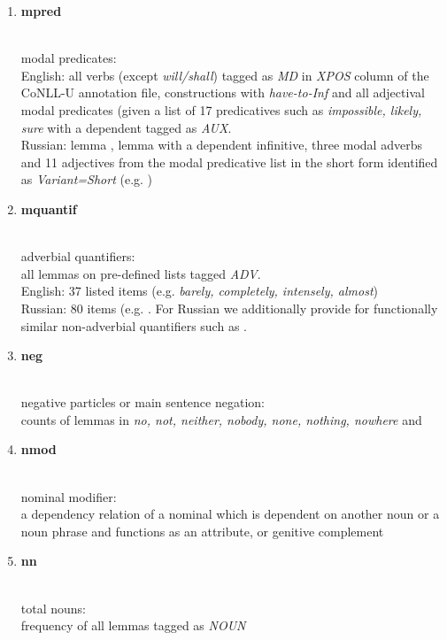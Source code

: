 \begin{enumerate}
	\item \hypertarget{ft:mpred}{\textbf{mpred}} \\
		modal predicates: \\
		English: all verbs (except \textit{will/shall}) tagged as \textit{MD} in \textit{XPOS} column of the CoNLL-U annotation file,
		constructions with \textit{have-to-Inf} and all adjectival modal predicates (given a list of 17 predicatives such as \textit{impossible, likely, sure} with a dependent tagged as \textit{AUX}. \\
		Russian: lemma , lemma  with a dependent infinitive, three modal adverbs  and 11 adjectives from the modal predicative list in the
		short form identified as \textit{Variant=Short} (e.g. )
	
	\item \hypertarget{ft:mquantif}{\textbf{mquantif}} \\
		adverbial quantifiers: \\
		all lemmas on pre-defined lists tagged \textit{ADV}. \\
		English: 37 listed items (e.g. \textit{barely, completely, intensely, almost}) \\
		Russian: 80 items (e.g. . For Russian we additionally provide for functionally similar non-adverbial quantifiers such as .
	
	\item \hypertarget{ft:neg}{\textbf{neg}} \\
		negative particles or main sentence negation: \\
		counts of lemmas in \textit{no, not, neither, nobody, none, nothing, nowhere} and 
	
	\item \hypertarget{ft:nmod}{\textbf{nmod}} \\
		nominal modifier: \\
		a dependency relation of a nominal which is dependent on another noun or a noun phrase and functions as an attribute, or genitive complement
	
	\item \hypertarget{ft:nn}{\textbf{nn}} \\
		total nouns: \\
		frequency of all lemmas tagged as \textit{NOUN}
		

\end{enumerate}
